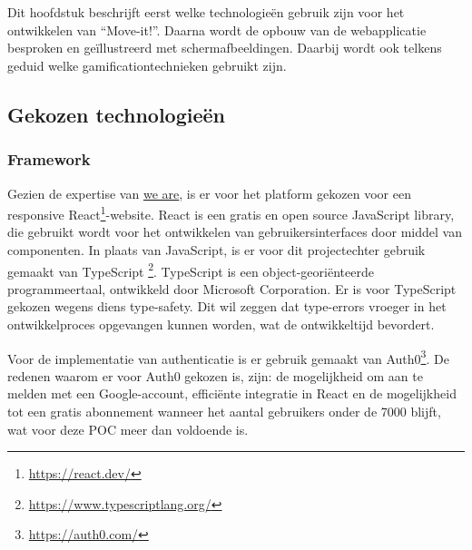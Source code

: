 \chapter{}%
\label{ch:proofofconcept}

Dit hoofdstuk beschrijft eerst welke technologieën gebruik zijn voor het ontwikkelen van ``Move-it!''. Daarna wordt de opbouw van de webapplicatie besproken en geïllustreerd met schermafbeeldingen. Daarbij wordt ook telkens geduid welke gamificationtechnieken gebruikt zijn.

\section{Gekozen technologieën}

\subsection{Framework}

Gezien de expertise van \href{https://www.we-are.be/}{we are}, is er voor het platform gekozen voor een responsive React\footnote{\href{https://react.dev/}{https://react.dev/}}-website. React is een gratis en open source JavaScript library, die gebruikt wordt voor het ontwikkelen van gebruikersinterfaces door middel van componenten. In plaats van JavaScript, is er voor dit projectechter gebruik gemaakt van TypeScript \footnote{\href{https://www.typescriptlang.org/}{https://www.typescriptlang.org/}}. TypeScript is een object-georiënteerde programmeertaal, ontwikkeld door Microsoft Corporation. Er is voor TypeScript gekozen wegens diens type-safety. Dit wil zeggen dat type-errors vroeger in het ontwikkelproces opgevangen kunnen worden, wat de ontwikkeltijd bevordert.

Voor de implementatie van authenticatie is er gebruik gemaakt van Auth0\footnote{\href{https://auth0.com/}{https://auth0.com/}}. De redenen waarom er voor Auth0 gekozen is, zijn: de mogelijkheid om aan te melden met een Google-account, efficiënte integratie in React en de mogelijkheid tot een gratis abonnement wanneer het aantal gebruikers onder de 7000 blijft, wat voor deze POC meer dan voldoende is.

